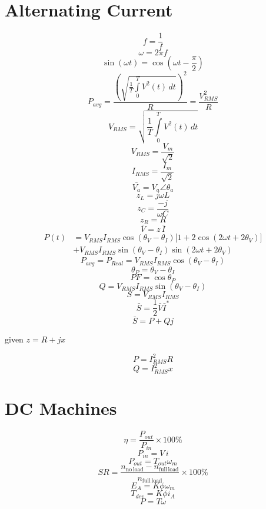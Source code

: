 \documentclass[14pt]{article}
\begin{document}
    \section{Alternating Current}
    \begin{multicols}{2}
        $$f=\frac{1}{f}$$
        $$\omega=2\pi f$$
        $$\sin(\omega t)=\cos\left(\omega t-\frac{\pi}{2}\right)$$
        $$P_{avg}=\frac{\left(\sqrt{\frac{1}{T}\int\limits_0^TV^2(t)\, dt}\right)^2}{R}=\frac{V_{RMS}^2}{R}$$
        $$V_{RMS}=\sqrt{\frac{1}{T}\int\limits_0^TV^2(t)\, dt}$$
        $$V_{RMS}=\frac{V_m}{\sqrt{2}}$$
        $$I_{RMS}=\frac{I_m}{\sqrt{2}}$$
        $$\bar {V_a}=V_a\angle\theta_a$$
        $$z_L=j\omega L$$
        $$z_C=\frac{-j}{\omega C}$$
        $$z_R=R$$
        $$\bar {V}=z\, \bar{I}$$
        \begin{align*}
            P(t)&=V_{RMS}I_{RMS}\cos(\theta_V-\theta_I)\big[1+2\cos(2\omega t+2\theta_V)\big]\\&+V_{RMS}I_{RMS}\sin(\theta_V-\theta_I)\sin(2\omega t+2\theta_V)
        \end{align*}
        $$P_{avg}=P_{Real}=V_{RMS}I_{RMS}\cos(\theta_V-\theta_I)$$
        $$\theta_P=\theta_V-\theta_I$$
        $$PF=\cos \theta_P$$
        $$Q=V_{RMS}I_{RMS}\sin(\theta_V-\theta_I)$$
        $$S=V_{RMS}I_{RMS}$$
        $$\bar S=\frac{1}{2}\bar V\bar I^*$$
        $$\bar S=P+Qj$$
        \begin{center}
            given $z=R+jx$ 
        \end{center}
        $$P=I_{RMS}^2R$$
        $$Q=I_{RMS}^2x$$
    \end{multicols}
    \section{DC Machines}
    \begin{multicols}{2}
        $$\eta=\frac{P_{out}}{P_{in}}\times100\%$$
        $$P_{in}=V\, i$$
        $$P_{out}=T_{out}\omega_m$$
        $$SR=\frac{n_{\mathrm{no\, load}}-n_{\mathrm{full\, load}}}{n_{\mathrm{full\,load}}}\times100\%$$
        $$\boxed{E_A=K\phi\omega_m}$$
        $$\boxed{T_{dev}=K\phi i_A}$$
        $$\boxed{P=T\omega}$$
    \end{multicols}
\end{document}
